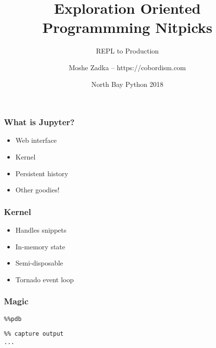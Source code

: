 \usepackage[utf8]{inputenc}
\usepackage{listings}
\usepackage{textcomp}
\usepackage{fancyvrb}

\title{Exploration Oriented Programmming Nitpicks}
\subtitle{REPL to Production}
\author{Moshe Zadka -- https://cobordism.com}
\date{North Bay Python 2018}
 

 
\begin{titlepage}
\maketitle
\end{titlepage}

\frame{\titlepage}

\begin{frame}
\frametitle{What is Jupyter?}

\begin{itemize}
\item Web interface
\item Kernel
\item Persistent history
\item Other goodies!
\end{itemize}

\end{frame}

\begin{frame}
\frametitle{Kernel}

\begin{itemize}
\item Handles snippets
\item In-memory state
\item Semi-disposable
\item Tornado event loop
\end{itemize}

\end{frame}

\begin{frame}[fragile]
\frametitle{Magic}

\begin{lstlisting}
%%pdb
\end{lstlisting}

\begin{lstlisting}
%% capture output
...
\end{lstlisting}

\end{frame}

